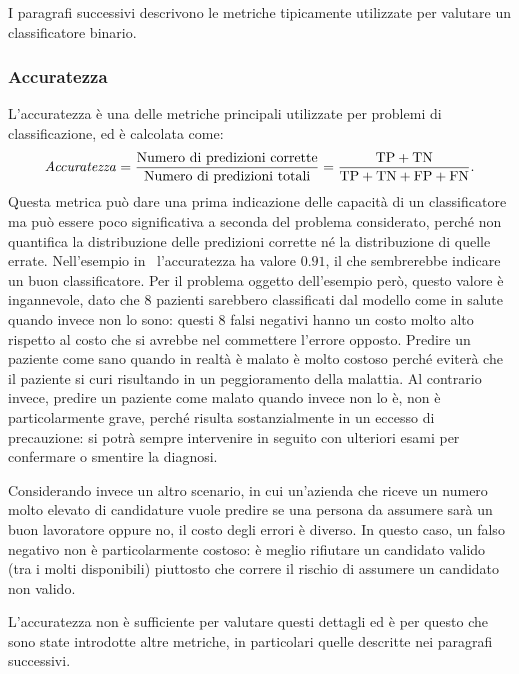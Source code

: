 
I paragrafi successivi descrivono le metriche tipicamente utilizzate per valutare un classificatore binario.

\subsubsection{Accuratezza} L'accuratezza è una delle metriche principali utilizzate per problemi di classificazione, ed è calcolata come:
\begin{equation*}
    \textrm{\emph{Accuratezza}} = \frac{\text{Numero di predizioni corrette}}{\text{Numero di predizioni totali}} = \frac{\text{TP} + \text{TN}}{\text{TP} + \text{TN} + \text{FP} + \text{FN}}.
\end{equation*}
Questa metrica può dare una prima indicazione delle capacità di un classificatore ma può essere poco significativa a seconda del problema considerato, perché non quantifica la distribuzione delle predizioni corrette né la distribuzione di quelle errate.
Nell'esempio in~ l'accuratezza ha valore $0.91$, il che sembrerebbe indicare un buon classificatore.
Per il problema oggetto dell'esempio però, questo valore è ingannevole, dato che 8 pazienti sarebbero classificati dal modello come in salute quando invece non lo sono: questi 8 falsi negativi hanno un costo molto alto rispetto al costo che si avrebbe nel commettere l'errore opposto. 
Predire un paziente come sano quando in realtà è malato è molto costoso perché eviterà che il paziente si curi risultando in un peggioramento della malattia. 
Al contrario invece, predire un paziente come malato quando invece non lo è, non è particolarmente grave, perché risulta sostanzialmente in un eccesso di precauzione: si potrà sempre intervenire in seguito con ulteriori esami per confermare o smentire la diagnosi.

Considerando invece un altro scenario, in cui un'azienda che riceve un numero molto elevato di candidature vuole predire se una persona da assumere sarà un buon lavoratore oppure no, il costo degli errori è diverso. In questo caso, un falso negativo non è particolarmente costoso: è meglio rifiutare un candidato valido (tra i molti disponibili) piuttosto che correre il rischio di assumere un candidato non valido. 

L'accuratezza non è sufficiente per valutare questi dettagli ed è per questo che sono state introdotte altre metriche, in particolari quelle descritte nei paragrafi successivi.

